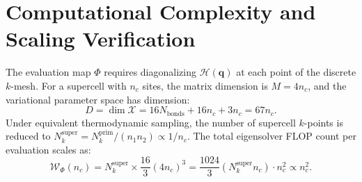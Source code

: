 \section{Computational Complexity and Scaling Verification}
\label{sec:m1_7_complexity_scaling}

The evaluation map $\Phi$ requires diagonalizing $\mathcal{H}(\mathbf{q})$ at each point of the discrete $k$-mesh. For a supercell with $n_c$ sites, the matrix dimension is $M = 4n_c$, and the variational parameter space has dimension:
\begin{equation}
\label{eq:m1_7_dim_x}
D = \dim \mathcal{X} = 16 N_{\mathrm{bonds}} + 16 n_c + 3 n_c = 67 n_c.
\end{equation}
Under equivalent thermodynamic sampling, the number of supercell $k$-points is reduced to $N_k^{\mathrm{super}} = N_k^{\mathrm{prim}} / (n_1 n_2) \propto 1 / n_c$. The total eigensolver FLOP count per evaluation scales as:
\begin{equation}
\label{eq:m1_7_flop_scaling}
\mathcal{W}_{\Phi}(n_c) = N_k^{\mathrm{super}} \times \frac{16}{3} (4n_c)^3 = \frac{1024}{3} (N_k^{\mathrm{super}} n_c) \cdot n_c^2 \propto n_c^2.
\end{equation}




